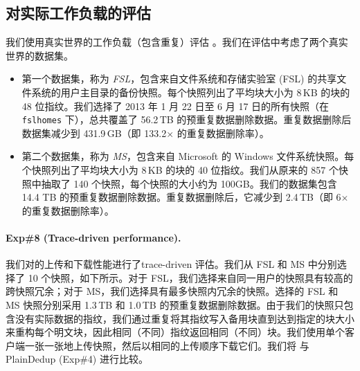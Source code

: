\subsection{对实际工作负载的评估}
\label{subsec:sgxdedup-real-world}

我们使用真实世界的工作负载（包含重复）评估 \sysnameS。我们在评估中考虑了两个真实世界的数据集。
\begin{itemize}[leftmargin=*]
\item 第一个数据集，称为 \textit{ FSL}，包含来自文件系统和存储实验室 (FSL) \cite{fsl,sun16} 的共享文件系统的用户主目录的备份快照。每个快照列出了平均块大小为 8\,KB 的块的 48 位指纹。我们选择了 2013 年 1 月 22 日至 6 月 17 日的所有快照（在 \texttt{fslhomes} 下），总共覆盖了 56.2\,TB 的预重复数据删除数据。重复数据删除后数据集减少到 431.9\,GB（即 133.2$\times$ 的重复数据删除率）。
\item 第二个数据集，称为 \textit{ MS}，包含来自 Microsoft \cite{meyer11} 的 Windows 文件系统快照。每个快照列出了平均块大小为 8\,KB 的块的 40 位指纹。我们从原来的 857 个快照中抽取了 140 个快照，每个快照的大小约为 100GB。我们的数据集包含 14.4 TB 的预重复数据删除数据。重复数据删除后，它减少到 2.4\,TB（即 6$\times$ 的重复数据删除率）。
\end{itemize}



\paragraph*{Exp\#8 (Trace-driven performance).} 我们对\sysnameS 的上传和下载性能进行了trace-driven 评估。我们从 FSL 和 MS 中分别选择了 10 个快照，如下所示。对于 FSL，我们选择来自同一用户的快照具有较高的跨快照冗余；对于 MS，我们选择具有最多快照内冗余的快照。选择的 FSL 和 MS 快照分别采用 1.3\,TB 和 1.0\,TB 的预重复数据删除数据。由于我们的快照只包含没有实际数据的指纹，我们通过重复将其指纹写入备用块直到达到指定的块大小来重构每个明文块，因此相同（不同）指纹返回相同（不同）块。我们使用单个客户端一张一张地上传快照，然后以相同的上传顺序下载它们。我们将 \sysnameS 与 PlainDedup (Exp\#4) 进行比较。

